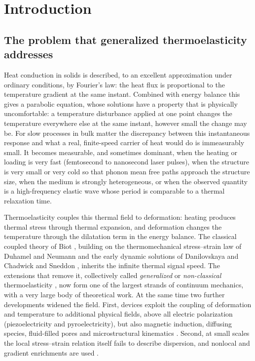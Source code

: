 \section{Introduction}\label{sec:intro}
\subsection{The problem that generalized thermoelasticity addresses}
Heat conduction in solids is described, to an excellent approximation under ordinary conditions, by Fourier's law: the heat flux is proportional to the temperature gradient at the same instant. Combined with energy balance this gives a parabolic equation, whose solutions have a property that is physically uncomfortable: a temperature disturbance applied at one point changes the temperature everywhere else at the same instant, however small the change may be. For slow processes in bulk matter the discrepancy between this instantaneous response and what a real, finite-speed carrier of heat would do is immeasurably small. It becomes measurable, and sometimes dominant, when the heating or loading is very fast (femtosecond to nanosecond laser pulses), when the structure is very small or very cold so that phonon mean free paths approach the structure size, when the medium is strongly heterogeneous, or when the observed quantity is a high-frequency elastic wave whose period is comparable to a thermal relaxation time.

Thermoelasticity couples this thermal field to deformation: heating produces thermal stress through thermal expansion, and deformation changes the temperature through the dilatation term in the energy balance. The classical coupled theory of Biot \citep{Biot1956}, building on the thermomechanical stress--strain law of Duhamel and Neumann \citep{Duhamel1837} and the early dynamic solutions of Danilovskaya \citep{Danilovskaya1950} and Chadwick and Sneddon \citep{ChadwickSneddon1958,Chadwick1960}, inherits the infinite thermal signal speed. The extensions that remove it, collectively called \emph{generalized} or \emph{non-classical} thermoelasticity \citep{Chandrasekharaiah1986,Chandrasekharaiah1998,HetnarskiIgnaczak1999,HetnarskiIgnaczak2000,IgnaczakOstoja2010}, now form one of the largest strands of continuum mechanics, with a very large body of theoretical work. At the same time two further developments widened the field. First, devices exploit the coupling of deformation and temperature to additional physical fields, above all electric polarization (piezoelectricity and pyroelectricity), but also magnetic induction, diffusing species, fluid-filled pores and microstructural kinematics \citep{Mindlin1974Thermopiezo,Nowacki1978,Eringen1999,Iesan2004}. Second, at small scales the local stress--strain relation itself fails to describe dispersion, and nonlocal and gradient enrichments are used \citep{Eringen1972,Eringen1983,Aifantis1992,Askes2011}.

